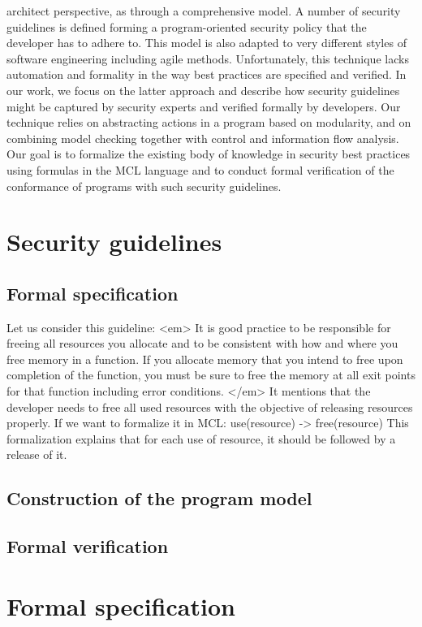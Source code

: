 \documentclass[10pt]{article}
\begin{document}
architect perspective, as through a comprehensive model. A number of security guidelines is
defined forming a program-oriented security policy that the developer has to adhere to. This
model is also adapted to very different styles of software engineering including agile methods.
Unfortunately, this technique lacks automation and formality in the way best practices are
specified and verified.
In our work, we focus on the latter approach and describe how security guidelines might
be captured by security experts and verified formally by developers. Our technique relies
on abstracting actions in a program based on modularity, and on combining model checking
together with control and information flow analysis. Our goal is to formalize the existing
body of knowledge in security best practices using formulas in the MCL language and to
conduct formal verification of the conformance of programs with such security guidelines.
\section{Security guidelines}
\subsection {Formal specification}
Let us consider this guideline:
<em> It is good practice to be responsible for freeing all resources you allocate and to be consistent with how and where you free memory in a function. If you allocate memory that you intend to free upon completion of the function, you must be sure to free the memory at all exit points for that function including error conditions.
 </em> \cite{https://cwe.mitre.org/data/definitions/404.html}
It mentions that the developer needs to free all used resources with the objective of releasing resources properly.
If we want to formalize it in MCL:
use(resource) -> free(resource)
This formalization explains that for each use of resource, it should be followed by a release of it.

\subsection {Construction of the program model}
\subsection {Formal verification}
\section{Formal specification}
\end{document}
